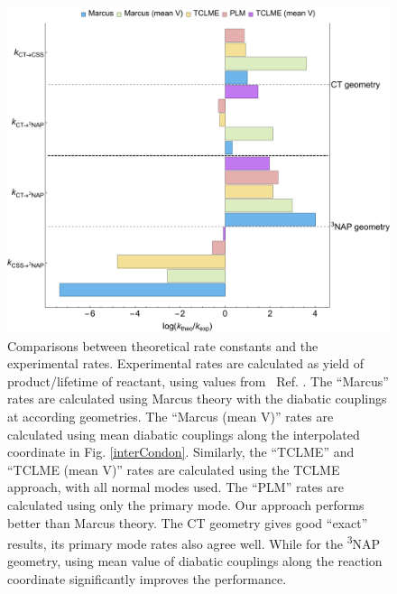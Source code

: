 \begin{figure}[]
\includegraphics[width=\columnwidth]{Chapters/chap4/Images/kTCLME-VS-EXPT.pdf}
\caption{Comparisons between theoretical rate constants and the experimental rates. Experimental rates are calculated as yield of product/lifetime of reactant, using values from ~Ref. \cite{delor2015mechanism}.  The ``Marcus'' rates are calculated using Marcus theory with the diabatic couplings at according geometries. The ``Marcus (mean V)'' rates are calculated using mean diabatic couplings along the interpolated coordinate in Fig. \ref{interCondon}. Similarly, the ``TCLME'' and ``TCLME (mean V)'' rates are calculated using the TCLME approach, with all normal modes used. The ``PLM'' rates are calculated using only the primary mode. Our approach performs better than Marcus theory. The CT geometry gives good ``exact'' results, its primary mode rates also agree well. While for the \textsuperscript{3}NAP geometry, using mean value of diabatic couplings along the reaction coordinate significantly improves the performance.\label{rateComp}}
\end{figure}



